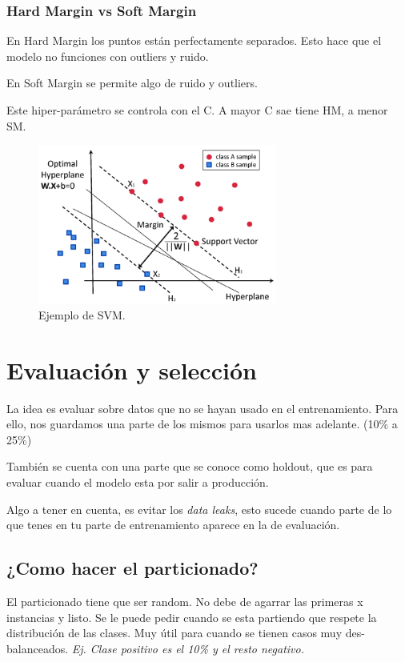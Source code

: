 \documentclass[titlepage,a4paper]{article}
\begin{document}
\subsubsection*{Hard Margin vs Soft Margin}

En Hard Margin los puntos están perfectamente separados. Esto hace que el modelo no funciones con outliers y ruido.

En Soft Margin se permite algo de ruido y outliers.

Este hiper-parámetro se controla con el C. A mayor C sae tiene HM, a menor SM.

\begin{figure}[!htb]
    \centering
    \includegraphics[width=0.7\textwidth]{imagenesResumen/SVM.png}
    \caption{Ejemplo de SVM.}
\end{figure}

\newpage

\section{Evaluación y selección}

La idea es evaluar sobre datos que no se hayan usado en el entrenamiento. Para ello, nos guardamos una parte de los mismos para usarlos mas adelante. (10\% a 25\%)

También se cuenta con una parte que se conoce como holdout, que es para evaluar cuando el modelo esta por salir a producción.

Algo a tener en cuenta, es evitar los \textit{data leaks}, esto sucede cuando parte de lo que tenes en tu parte de entrenamiento aparece en la de evaluación.

\subsection{¿Como hacer el particionado?}

El particionado tiene que ser random. No debe de agarrar las primeras x instancias y listo. Se le puede pedir cuando se esta partiendo que respete la distribución de las clases. Muy útil para cuando se tienen casos muy des-balanceados. \textit{Ej. Clase positivo es el 10\% y el resto negativo.}
\end{document}
